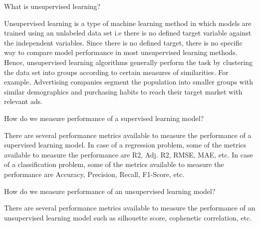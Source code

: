 	\begin{qanda}
		\begin{question}
What is unsupervised learning?
		\end{question}
		\begin{answer}
Unsupervised learning is a type of machine learning method in which models are trained using an unlabeled data set i.e there is no defined target variable against the independent variables. Since there is no defined target, there is no specific way to compare model performance in most unsupervised learning methods. Hence, unsupervised learning algorithms generally perform the task by clustering the data set into groups according to certain measures of similarities. For example, Advertising companies segment the population into smaller groups with similar demographics and purchasing habits to reach their target market with relevant ads.
		\end{answer}
	\end{qanda}

	\begin{qanda}
		\begin{question}
How do we measure performance of a supervised learning model?
		\end{question}
		\begin{answer}
There are several performance metrics available to measure the performance of a supervised learning model. In case of a regression problem, some of the metrics available to measure the performance are R2, Adj. R2, RMSE, MAE, etc. In case of a classification problem, some of the metrics available to measure the performance are Accuracy, Precision, Recall, F1-Score, etc.
		\end{answer}
	\end{qanda}

	\begin{qanda}
		\begin{question}
How do we measure performance of an unsupervised learning model?
		\end{question}
		\begin{answer}
There are several performance metrics available to measure the performance of an unsupervised learning model such as silhouette score, cophenetic correlation, etc.
		\end{answer}
	\end{qanda}

